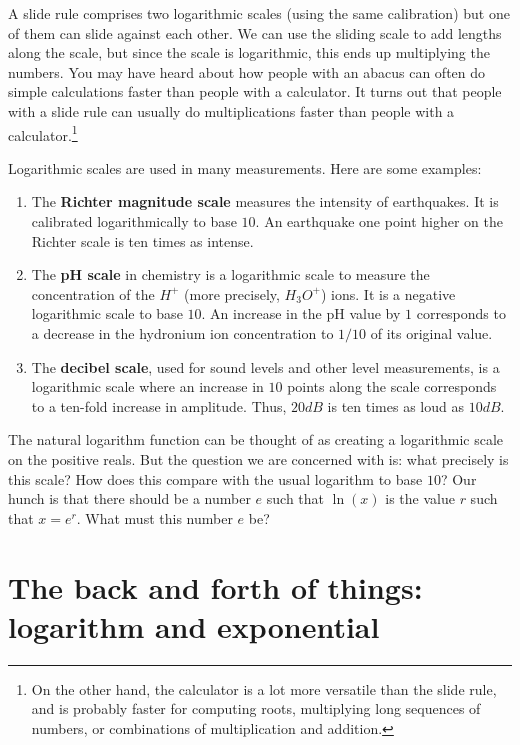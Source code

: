 \documentclass[10pt]{amsart}
\begin{document}
A slide rule comprises two logarithmic scales (using the same
calibration) but one of them can slide against each other. We can use
the sliding scale to add lengths along the scale, but since the scale
is logarithmic, this ends up multiplying the numbers. You may have
heard about how people with an abacus can often do simple calculations
faster than people with a calculator. It turns out that people with a
slide rule can usually do multiplications faster than people with a
calculator.\footnote{On the other hand, the calculator is a lot more
versatile than the slide rule, and is probably faster for computing
roots, multiplying long sequences of numbers, or combinations of
multiplication and addition.}

Logarithmic scales are used in many measurements. Here are some
examples:

\begin{enumerate}

\item The {\bf Richter magnitude scale} measures the intensity of
  earthquakes. It is calibrated logarithmically to base $10$. An
  earthquake one point higher on the Richter scale is ten times as
  intense. 
\item The {\bf pH scale} in chemistry is a logarithmic scale to
  measure the concentration of the $H^+$ (more precisely, $H_3O^+$)
  ions. It is a negative logarithmic scale to base $10$. An increase
  in the pH value by $1$ corresponds to a decrease in the hydronium
  ion concentration to $1/10$ of its original value.
\item The {\bf decibel scale}, used for sound levels and other level
  measurements, is a logarithmic scale where an increase in $10$
  points along the scale corresponds to a ten-fold increase in
  amplitude. Thus, $20 dB$ is ten times as loud as $10 dB$.

\end{enumerate}

The natural logarithm function can be thought of as creating a
logarithmic scale on the positive reals. But the question we are
concerned with is: what precisely is this scale? How does this compare
with the usual logarithm to base $10$? Our hunch is that there should
be a number $e$ such that $\ln(x)$ is the value $r$ such that $x =
e^r$. What must this number $e$ be?

\section{The back and forth of things: logarithm and exponential}
\end{document}
